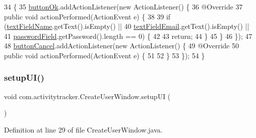 \begin{DoxyCode}
34                                         \{
35         \mbox{\hyperlink{classcom_1_1activitytracker_1_1_create_user_window_aa22864c8baa65b46fe9a7621748d7841}{buttonOk}}.addActionListener(\textcolor{keyword}{new} ActionListener() \{
36             @Override
37             \textcolor{keyword}{public} \textcolor{keywordtype}{void} actionPerformed(ActionEvent e) \{
38 
39                 \textcolor{keywordflow}{if} (\mbox{\hyperlink{classcom_1_1activitytracker_1_1_create_user_window_aa2b8cf1781a8a1534dbf5c5b98332c05}{textFieldName}}.getText().isEmpty() ||
40                     \mbox{\hyperlink{classcom_1_1activitytracker_1_1_create_user_window_a4f6010631cb7be5a2ae3691bdca31483}{textFieldEmail}}.getText().isEmpty() ||
41                     \mbox{\hyperlink{classcom_1_1activitytracker_1_1_create_user_window_a29be9c267c003ae90731199d8257dc0a}{passwordField}}.getPassword().length == 0) \{
42 
43                     \textcolor{keywordflow}{return};
44                 \}
45             \}
46         \});
47 
48         \mbox{\hyperlink{classcom_1_1activitytracker_1_1_create_user_window_a975a5cc35d145a3efa4d9e340776ca63}{buttonCancel}}.addActionListener(\textcolor{keyword}{new} ActionListener() \{
49             @Override
50             \textcolor{keyword}{public} \textcolor{keywordtype}{void} actionPerformed(ActionEvent e) \{
51 
52             \}
53         \});
54     \}
\end{DoxyCode}
\mbox{\label{classcom_1_1activitytracker_1_1_create_user_window_a41715d85194c6bb84cf6969f771940dc}} 
\subsubsection{\texorpdfstring{setup\+U\+I()}{setupUI()}}
{\footnotesize\ttfamily void com.\+activitytracker.\+Create\+User\+Window.\+setup\+UI (\begin{DoxyParamCaption}{ }\end{DoxyParamCaption})\hspace{0.3cm}{\ttfamily [private]}}



Definition at line 29 of file Create\+User\+Window.\+java.


